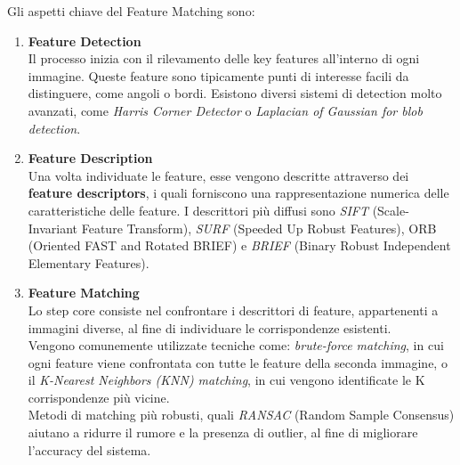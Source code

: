 \documentclass[12pt,a4paper,openright,twoside]{book}
\begin{document}
Gli aspetti chiave del Feature Matching sono:
\begin{enumerate}

\item \textbf{Feature Detection}\\
Il processo inizia con il rilevamento delle key features all'interno di ogni immagine. Queste feature sono tipicamente punti di interesse facili da distinguere, come angoli o bordi. Esistono diversi  sistemi di detection molto avanzati, come {\itshape Harris Corner Detector} o {\itshape Laplacian of Gaussian for blob detection}.

\item \textbf{Feature Description}\\
Una volta individuate le feature, esse vengono descritte attraverso dei \textbf{feature descriptors}, i quali forniscono una rappresentazione numerica delle caratteristiche delle feature. I descrittori più diffusi sono {\itshape SIFT} (Scale-Invariant Feature Transform), {\itshape SURF} (Speeded Up Robust Features), ORB (Oriented FAST and Rotated BRIEF) e {\itshape BRIEF} (Binary Robust Independent Elementary Features).

\item \textbf{Feature Matching}\\
Lo step core consiste nel confrontare i descrittori di feature, appartenenti a immagini diverse, al fine di individuare le corrispondenze esistenti. \\
Vengono comunemente utilizzate tecniche come: {\itshape brute-force matching}, in cui ogni feature viene confrontata con tutte le feature della seconda immagine, o il  {\itshape K-Nearest Neighbors (KNN) matching}, in cui vengono identificate le K corrispondenze più vicine.\\
Metodi di matching più robusti, quali {\itshape RANSAC} (Random Sample Consensus) aiutano a ridurre il rumore e la presenza di outlier, al fine di migliorare l'accuracy del sistema.

\end{enumerate}

\end{document}
